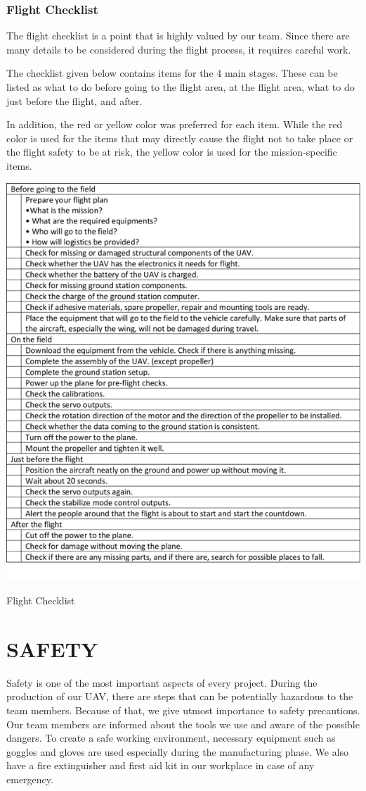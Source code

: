 \documentclass[12pt]{article}
\begin{document}
\subsubsection{Flight Checklist}
The flight checklist is a point that is highly valued by our team. Since there are many details to be considered during the flight process, it requires careful work.

\justify
The checklist given below contains items for the 4 main stages. These can be listed as what to do before going to the flight area, at the flight area, what to do just before the flight, and after.

\justify
In addition, the red or yellow color was preferred for each item. While the red color is used for the items that may directly cause the flight not to take place or the flight safety to be at risk, the yellow color is used for the mission-specific items.
\begin{table}[ht]
	\centering
	\includegraphics[width = .9\linewidth]{figures/checklist.png}
	\caption{Flight Checklist}
       \label{fig:checklist}
 \end{table}

\FloatBarrier
\section{SAFETY}
 Safety is one of the most important aspects of every project. During the production of our UAV, there are steps that can be potentially hazardous to the team members. Because of that, we give utmost importance to safety precautions. Our team members are informed about the tools we use and aware of the possible dangers. To create a safe working environment, necessary equipment such as goggles and gloves are used especially during the manufacturing phase. We also have a fire extinguisher and first aid kit in our workplace in case of any emergency. 
 
\end{document}
